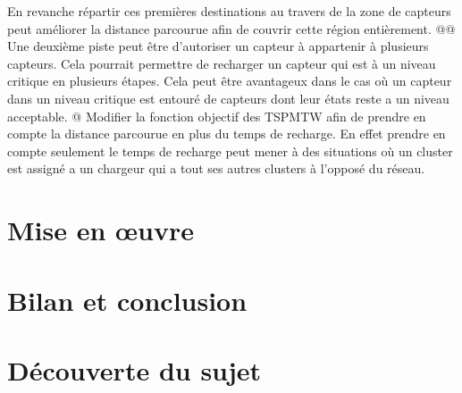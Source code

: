 \documentclass[noposter]{polytech}
\begin{document}
\begin{easylist}
		En revanche répartir ces premières destinations au travers de la zone de capteurs peut améliorer la distance parcourue afin de couvrir cette région entièrement.
		@@ Une deuxième piste peut être d'autoriser un capteur à appartenir à plusieurs capteurs.
		Cela pourrait permettre de recharger un capteur qui est à un niveau critique en plusieurs étapes.
		Cela peut être avantageux dans le cas où un capteur dans un niveau critique est entouré de capteurs dont leur états reste a un niveau acceptable.
		@ Modifier la fonction objectif des TSPMTW afin de prendre en compte la distance parcourue en plus du temps de recharge.
		En effet prendre en compte seulement le temps de recharge peut mener à des situations où un cluster est assigné a un chargeur qui a tout ses autres clusters à l'opposé du réseau.
		
	\end{easylist}
\chapter{Mise en œuvre}
\chapter{Bilan et conclusion}
\appendix
\chapter{Découverte du sujet}
\end{document}
